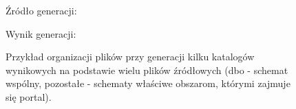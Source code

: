 \begin{figure}[!ht]
Źródło generacji:


Wynik generacji:


\caption{Przykład organizacji plików przy generacji kilku katalogów wynikowych na podstawie wielu plików źródłowych (dbo - schemat wspólny, pozostałe - schematy właściwe obszarom, którymi zajmuje się portal).}
\label{fig:implementation_core:multipleSourceFiles}
\end{figure}
